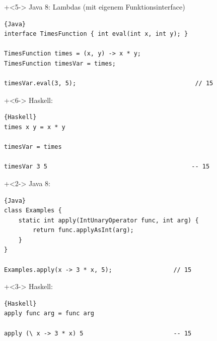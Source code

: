 \begin{frame}[fragile]{}
\onslide+<5->
Java 8: Lambdas (mit eigenem Funktionsinterface)
\begin{lstlisting}{Java}
interface TimesFunction { int eval(int x, int y); }

TimesFunction times = (x, y) -> x * y;
TimesFunction timesVar = times;

timesVar.eval(3, 5);                                 // 15
\end{lstlisting}
\onslide+<6->
Haskell:
\begin{lstlisting}{Haskell}
times x y = x * y

timesVar = times

timesVar 3 5                                        -- 15
\end{lstlisting}

\end{frame}

\begin{frame}[fragile]{}
\onslide+<2->
Java 8:
\begin{lstlisting}{Java}
class Examples { 
    static int apply(IntUnaryOperator func, int arg) { 
        return func.applyAsInt(arg); 
    }
}

Examples.apply(x -> 3 * x, 5);                 // 15
\end{lstlisting}

\onslide+<3->
Haskell:
\begin{lstlisting}{Haskell}
apply func arg = func arg

apply (\ x -> 3 * x) 5                         -- 15
\end{lstlisting}

\end{frame}

